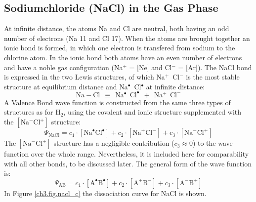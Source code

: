 \subsection{Sodiumchloride (NaCl) in the Gas Phase}

At infinite distance, the atoms Na and Cl are neutral, both having an odd number of electrons (Na 11 and Cl 17).  When the atoms are brought together an ionic bond is formed, in which one electron is transfered from sodium to the chlorine atom. In the ionic bond both atoms have an even number of electrons and have a noble gas configuration (Na$^{+}$ = [Ne] and Cl$^{-}$ = [Ar]). The NaCl bond is expressed in the two Lewis structures, of which \mbox{Na${}^{+}$ Cl${}^{-}$} is the most stable structure at equilibrium distance and \mbox{Na$^{\bullet}$ Cl$^{\bullet}$} at infinite distance:
\begin{equation}
\nonumber
\mathrm{Na-Cl\ \ \equiv \ \ Na^{\bullet}\ \ Cl^{\bullet}\ \ +\ \ Na^{+}\ \ Cl^{-}}
\end{equation}
A Valence Bond wave function is constructed from the same three types of structures as for H$_2$, using the covalent and ionic structure supplemented with the $[\mathrm{Na}^{-}\mathrm{Cl}^{+}]$ structure:
\begin{equation}
\nonumber
\Psi_{\mathrm{NaCl}} = c_1\cdot [\mathrm{Na}^\bullet \mathrm{Cl}^\bullet] + c_2 \cdot [\mathrm{Na}^{+}\mathrm{Cl}^{-}] + c_3 \cdot [\mathrm{Na}^{-}\mathrm{Cl}^{+}] 
\end{equation}
The $[\mathrm{Na}^{-}\mathrm{Cl}^{+}]$ structure has a negligible contribution ($c_3 \approx 0$) to the wave function over the whole range. Nevertheless, it is included here for comparability with all other bonds, to be discussed later. The general form of the wave function is:
\begin{equation}
\nonumber
\Psi_{\mathrm{AB}} = c_1\cdot [\mathrm{A}^\bullet \mathrm{B}^\bullet] + c_2 \cdot [\mathrm{A}^{+}\mathrm{B}^{-}] 
+ c_3 \cdot [\mathrm{A}^{-}\mathrm{B}^{+}] 
\end{equation}
In Figure \ref{ch3.fig.nacl_c} the dissociation curve for NaCl is shown.
